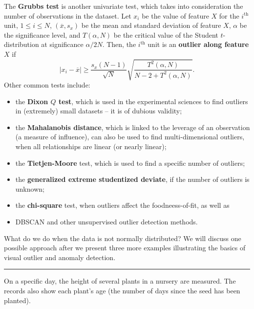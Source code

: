 \afterpage{\FloatBarrier}
The \textbf{Grubbs test} is another univariate test, which takes into consideration the number of observations in the dataset. Let $x_i$ be the value of feature $X$ for the $i^{\textrm{th}}$ unit, $1\leq i\leq N$, $(\overline{x},s_x)$ be the mean and standard deviation of feature $X$, $\alpha$ be the significance level, and $T(\alpha,N)$ be the critical value of the Student $t$-distribution at significance $\alpha/2N$. Then, the $i^{\textrm{th}}$ unit is an \textbf{outlier along feature} $X$ if $$|x_i-\overline{x}| \geq \frac{s_x(N-1)}{\sqrt{N}}\sqrt{\frac{T^2(\alpha,N)}{N-2+T^2(\alpha,N)}}.$$
Other common tests include:
\begin{itemize}[noitemsep]
\item the \textbf{Dixon $Q$ test}, which is used in the experimental sciences to find outliers in (extremely) small datasets -- it is of dubious validity;
\item the \textbf{Mahalanobis distance}, which is linked to the leverage of an observation (a measure of influence), can also be used to find multi-dimensional outliers, when all relationships are linear (or nearly linear);
\item the \textbf{Tietjen-Moore} test, which is used to find a specific number of outliers;
\item the \textbf{generalized extreme studentized deviate}, if the number of outliers is unknown; 
\item the \textbf{chi-square} test, when outliers affect the foodneess-of-fit, as well as 
\item DBSCAN and other unsupervised outlier detection methods.
\end{itemize}
What do we do when the data is not normally distributed? We will discuss one possible approach after we present three more examples illustrating the basics of visual outlier and anomaly detection. 
\begin{center}
    \rule{0.5\textwidth}{.4pt}
\end{center}
On a specific day, the height of several plants in a nursery are measured. The records also show each plant's age (the number of days since the seed has been planted).    
